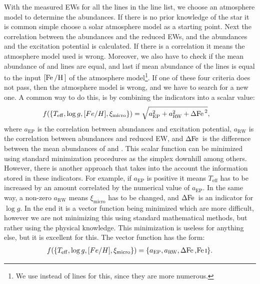 With the measured EWs for all the lines in the line list, we choose an
atmosphere model to determine the abundances. If there is no prior knowledge of
the star it is common simple choose a solar atmosphere model as a starting
point. Next the correlation between the abundances and the reduced EWs, and the
abundances and the excitation potential is calculated. If there is a correlation
it means the atmosphere model used is wrong. Moreover, we also have to check if
the mean abundance of  and  lines are equal, and last if
mean abundance of the  lines is equal to the input
$[\ion{Fe}/\ion{H}]$ of the atmosphere model\footnote{We use  instead
of  lines for this, since they are more numerous.}. If one of these
four criteria does not pass, then the atmosphere model is wrong, and we have to
search for a new one. A common way to do this, is by combining the indicators
into a scalar value:
\begin{align}
  f(\{T_\mathrm{eff}, \log g, [Fe/H], \xi_\mathrm{micro}\}) &= \sqrt{a_\mathrm{EP}^2 + a_\mathrm{RW}^2 + \Delta\ion{Fe}{}^2},
\end{align}
where $a_\mathrm{EP}$ is the correlation between abundances and excitation
potential, $a_\mathrm{RW}$ is the correlation between abundances and reduced EW,
and $\Delta\ion{Fe}{}$ is the difference between the mean abundances of
 and . This scalar function can be minimized using
standard minimization procedures as the simplex downhill among others. However,
there is another approach that takes into the account the information stored in
these indicators. For example, if $a_\mathrm{EP}$ is positive it means
$T_\mathrm{eff}$ has to be increased by an amount correlated by the numerical
value of $a_\mathrm{EP}$. In the same way, a non-zero $a_\mathrm{RW}$ means
$\xi_\mathrm{micro}$ has to be changed, and $\Delta\ion{Fe}{}$ is an indicator
for $\log g$. In the end it is a vector function being minimized which are more
difficult, however we are not minimizing this using standard mathematical
methods, but rather using the physical knowledge. This minimization is useless
for anything else, but it is excellent for this.
The vector function has the form:
\begin{align}
    f(\{T_\mathrm{eff}, \log g, [Fe/H], \xi_\mathrm{micro}\}) = \{a_\mathrm{EP}, a_\mathrm{RW}, \Delta\ion{Fe}, \ion{Fe}{I}\}.
\end{align}

